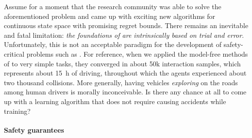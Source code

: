 Assume for a moment that the research community was able to solve the aforementioned problem and came up with exciting new algorithms for continuous state space with promising regret bounds. There remains an inevitable and fatal limitation: \emph{the foundations of  are intrinsically based on trial and error}. Unfortunately, this is not an acceptable paradigm for the development of safety-critical problems such as . For reference, when we applied the model-free methods of  to very simple tasks, they converged in about 50k interaction samples, which represents about \SI{15}{\hour} of driving, throughout which the agents experienced about two thousand collisions. More generally, having vehicles \emph{exploring} on the roads among human drivers is morally inconceivable. Is there any chance at all to come up with a learning algorithm that does not require causing accidents while training?

\paragraph{Safety guarantees}

